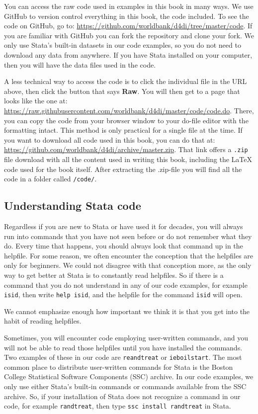 You can access the raw code used in examples in this book in many ways.
We use GitHub to version control everything in this book, the code included.
To see the code on GitHub, go to: \url{https://github.com/worldbank/d4di/tree/master/code}.
If you are familiar with GitHub you can fork the repository and clone your fork.
We only use Stata's built-in datasets in our code examples,
so you do not need to download any data from anywhere.
If you have Stata installed on your computer, then you will have the data files used in the code.

A less technical way to access the code is to click the individual file in the URL above, then click
the button that says \textbf{Raw}. You will then get to a page that looks like the one at:
\url{https://raw.githubusercontent.com/worldbank/d4di/master/code/code.do}.
There, you can copy the code from your browser window to your do-file editor with the formatting intact.
This method is only practical for a single file at the time.
If you want to download all code used in this book, you can do that at:
\url{https://github.com/worldbank/d4di/archive/master.zip}. That link offers a \texttt{.zip} file download
with all the content used in writing this book, including the \LaTeX{} code used for the book itself. After
extracting the .zip-file you will find all the code in a folder called \texttt{/code/}.

\subsection{Understanding Stata code}

Regardless if you are new to Stata or have used it for decades, you will always run into commands that
you have not seen before or do not remember what they do. Every time that happens, you should always look
that command up in the helpfile. For some reason, we often encounter the conception that the helpfiles
are only for beginners. We could not disagree with that conception more, as the only way to get better at Stata
is to constantly read helpfiles. So if there is a command that you do not understand in any of our code
examples, for example \texttt{isid}, then write \texttt{help isid}, and the helpfile for the command \texttt{isid} will open.

We cannot emphasize enough how important we think it is that you get into the habit of reading helpfiles.

Sometimes, you will encounter code employing user-written commands,
and you will not be able to read those helpfiles until you have installed the commands.
Two examples of these in our code are \texttt{reandtreat} or \texttt{ieboilstart}.
The most common place to distribute user-written commands for Stata is the Boston College Statistical Software Components
(SSC) archive. In our code examples, we only use either Stata's built-in commands or commands available from the
SSC archive. So, if your installation of Stata does not recognize a command in our code, for example
\texttt{randtreat}, then type \texttt{ssc install randtreat} in Stata.

